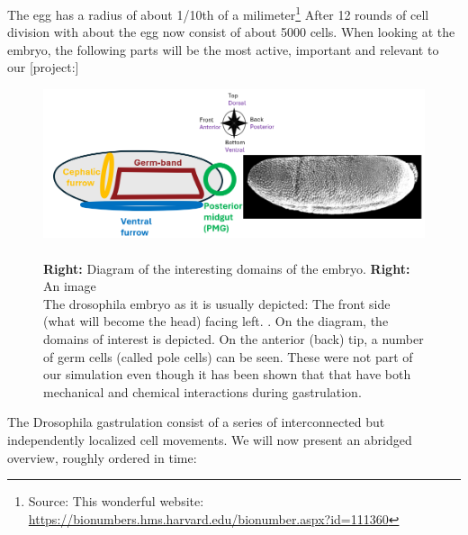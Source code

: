 The egg has a radius of about 1/10th of a milimeter\footnote{Source: This wonderful website: \url{https://bionumbers.hms.harvard.edu/bionumber.aspx?id=111360}}
After 12 rounds of cell division with about the egg now consist of about 5000 cells. 
When looking at the embryo, the following parts will be the most active, important and relevant to our [project:]
\begin{figure}[H]
    \centering
    \includegraphics[width=1\linewidth]{chapters//Theory//figures/MapOfEmbryo.png}
    \caption{\\\textbf{Right:} Diagram of the interesting domains of the embryo. \textbf{Right:} An image\\
    The drosophila embryo as it is usually depicted: The front side (what will become the head) facing left. .
    On the diagram, the domains of interest is depicted.
    On the anterior (back) tip, a number of germ cells (called pole cells) can be seen. These were not part of our simulation even though it has been shown that that have both mechanical and chemical interactions during gastrulation.}
    \label{fig:enter-label}
\end{figure}


The Drosophila gastrulation consist of a series of interconnected but independently localized cell movements. 
We will now present an abridged overview, roughly ordered in time:





